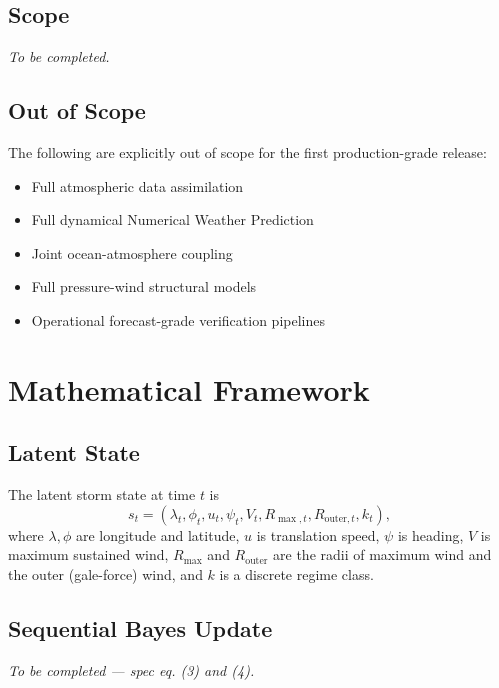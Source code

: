 \documentclass[11pt,a4paper]{article}
\begin{document}
\subsection{Scope}

\textit{To be completed.}

\subsection{Out of Scope}

The following are explicitly out of scope for the first production-grade release:

\begin{itemize}
  \item Full atmospheric data assimilation
  \item Full dynamical Numerical Weather Prediction
  \item Joint ocean-atmosphere coupling
  \item Full pressure-wind structural models
  \item Operational forecast-grade verification pipelines
\end{itemize}

\section{Mathematical Framework}

\subsection{Latent State}

The latent storm state at time $t$ is
\[
s_t = (\lambda_t, \phi_t, u_t, \psi_t, V_t, R_{\max,t}, R_{\text{outer},t}, k_t),
\]
where $\lambda, \phi$ are longitude and latitude, $u$ is translation speed,
$\psi$ is heading, $V$ is maximum sustained wind, $R_{\max}$ and $R_{\text{outer}}$
are the radii of maximum wind and the outer (gale-force) wind, and $k$ is a
discrete regime class.

\subsection{Sequential Bayes Update}

\textit{To be completed — spec eq. (3) and (4).}
\end{document}
